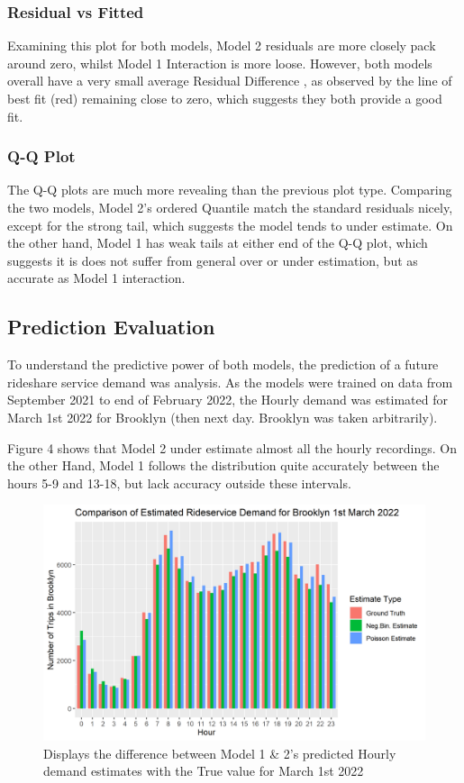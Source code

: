 \documentclass[11pt]{article}
\begin{document}
\subsubsection{Residual vs Fitted}
Examining this plot for both models, Model 2 residuals are more closely pack around zero, whilst Model 1 Interaction is more loose. However, both models overall have a very small average Residual Difference , as observed by the line of best fit (red) remaining close to zero, which suggests they both provide a good fit. 
\subsubsection{Q-Q Plot}
The Q-Q plots are much more revealing than the previous plot type. Comparing the two models, Model 2's ordered Quantile match the standard residuals nicely, except for the strong tail, which suggests the model tends to under estimate. On the other hand, Model 1 has weak tails at either end of the Q-Q plot, which suggests it is does not suffer from general over or under estimation, but as accurate as Model 1 interaction.
\subsection{Prediction Evaluation}
To understand the predictive power of both models, the prediction of a future rideshare service demand was analysis. As the models were trained on data from September 2021 to end of February 2022, the Hourly demand was estimated for March 1st 2022 for Brooklyn (then next day. Brooklyn was taken arbitrarily).

Figure 4 shows that Model 2 under estimate almost all the hourly recordings. On the other Hand, Model 1 follows the distribution quite accurately between the hours 5-9 and 13-18, but lack accuracy outside these intervals. 
\begin{figure}[h]
    \centering
    \includegraphics[width=12cm]{plots/March_1st_2022_Brooklyn_Prediction.png}
    \caption{Displays the difference between Model 1 \& 2's predicted Hourly demand estimates with the True value for March 1st 2022}
\end{figure}
\end{document}
